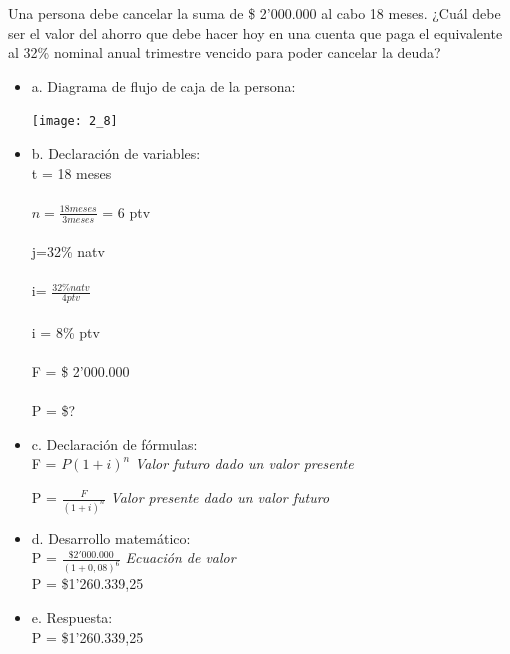 Una persona debe cancelar la suma de \$ 2'000.000 al cabo 18 meses. ¿Cuál debe ser el valor del ahorro que debe hacer hoy en una cuenta que paga el equivalente al 32\% nominal anual trimestre vencido para poder cancelar la deuda?\\

\begin{itemize}
	\item a. Diagrama de flujo de caja de la persona:\\
	\begin{center}
		\texttt{[image: 2\_8]}\\
	\end{center}
	
	\item b. Declaración de variables:\\
	
	t = 18 meses\\
	\\
	$n = \frac{18 meses}{3 meses}$ = 6 ptv\\
	\\
	j=32\% natv\\
	\\
	i=  $\frac{32\% natv}{4 ptv}$\\
	\\
	i = 8\% ptv\\
	\\
	F = \$ 2'000.000\\
	\\
	P = \$?\\
	
	\item c. Declaración de fórmulas:\\	
	F = $ P(1 + i)^n$ \hspace{35 pt} \textit{Valor futuro dado un valor presente}
	
	P = $\frac{F}{(1 + i)^{n}}$ \hspace{35 pt} \textit{Valor presente dado un valor futuro}\\	
	\item d. Desarrollo matemático:\\
	
	P = $\frac{\$2'000.000}{(1 + 0,08)^6}$ \hspace{35 pt} \textit{Ecuación de valor}\\
	
	P =  \$1'260.339,25\\
	
	\item e. Respuesta:\\
	
	P =  \$1'260.339,25\\ 
\end{itemize}

